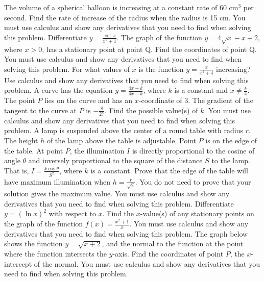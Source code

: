 \documentclass[12pt,addpoints]{exam}
\begin{document}
\begin{questions}
\fillwithlines{3cm}
\question[5] The volume of a spherical balloon is increasing at a constant rate of 60 cm\(^3\) per second. Find the rate of increase of the radius when the radius is 15 cm. You must use calculus and show any derivatives that you need to find when solving this problem.
\fillwithlines{3cm}
\question[5] Differentiate \( y = \frac{\cot x}{x^2 + 1} \).
\fillwithlines{3cm}
\question[5] The graph of the function \( y = 4\sqrt{x} - x + 2 \), where \( x > 0 \), has a stationary point at point Q. Find the coordinates of point Q. You must use calculus and show any derivatives that you need to find when solving this problem.
\fillwithlines{3cm}
\question[5] For what values of \( x \) is the function \( y = \frac{x}{x^2 + 4} \) increasing? Use calculus and show any derivatives that you need to find when solving this problem.
\fillwithlines{3cm}
\question[5] A curve has the equation \( y = \frac{4x + k}{4x - k} \), where \( k \) is a constant and \( x \neq \frac{k}{4} \). The point \( P \) lies on the curve and has an \( x \)-coordinate of 3. The gradient of the tangent to the curve at \( P \) is \(-\frac{8}{27}\). Find the possible value(s) of \( k \). You must use calculus and show any derivatives that you need to find when solving this problem.
\fillwithlines{3cm}
\question[5] A lamp is suspended above the center of a round table with radius \( r \). The height \( h \) of the lamp above the table is adjustable. Point \( P \) is on the edge of the table. At point \( P \), the illumination \( I \) is directly proportional to the cosine of angle \( \theta \) and inversely proportional to the square of the distance \( S \) to the lamp. That is, \( I = \frac{k \cos \theta}{S^2} \), where \( k \) is a constant. Prove that the edge of the table will have maximum illumination when \( h = \frac{r}{\sqrt{2}} \). You do not need to prove that your solution gives the maximum value. You must use calculus and show any derivatives that you need to find when solving this problem.
\fillwithlines{3cm}
\question[5] Differentiate \( y = (\ln x)^2 \) with respect to \( x \).
\fillwithlines{3cm}
\question[5] Find the \( x \)-value(s) of any stationary points on the graph of the function \( f(x) = \frac{x^2 + 1}{x} \). You must use calculus and show any derivatives that you need to find when solving this problem.
\fillwithlines{3cm}
\question[5] The graph below shows the function \( y = \sqrt{x+2} \), and the normal to the function at the point where the function intersects the \( y \)-axis. Find the coordinates of point \( P \), the \( x \)-intercept of the normal. You must use calculus and show any derivatives that you need to find when solving this problem.

\end{questions}
\end{document}
